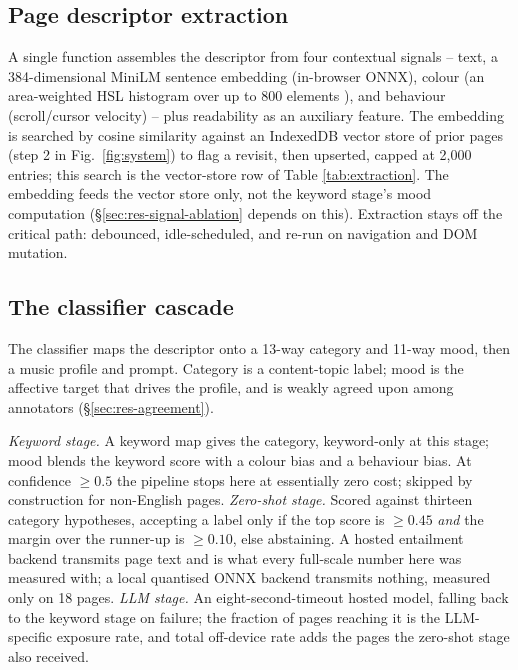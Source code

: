 \documentclass[conference]{IEEEtran}
\begin{document}
\subsection{Page descriptor extraction}

A single function assembles the descriptor from four contextual signals
-- text, a 384-dimensional MiniLM sentence embedding (in-browser ONNX),
colour (an area-weighted HSL histogram over up to 800 elements
\cite{dominantcolour}), and behaviour (scroll/cursor velocity) -- plus
readability \cite{flesch} as an auxiliary feature. The embedding is
searched by cosine similarity against an IndexedDB vector store of prior
pages (step 2 in Fig.~\ref{fig:system}) to flag a revisit, then upserted,
capped at 2,000 entries; this search is the vector-store row of Table
\ref{tab:extraction}. The embedding feeds the vector store only, not the
keyword stage's mood computation (\S\ref{sec:res-signal-ablation}
depends on this). Extraction stays off
the critical path: debounced, idle-scheduled, and re-run on navigation
and DOM mutation.

\subsection{The classifier cascade}

The classifier maps the descriptor onto a 13-way category and 11-way
mood, then a music profile and prompt. Category is a content-topic
label; mood is the affective target that drives the profile, and is
weakly agreed upon among annotators (\S\ref{sec:res-agreement}).

\emph{Keyword stage.} A keyword map gives the category, keyword-only
at this stage; mood blends the keyword score with a colour bias and a
behaviour bias. At confidence $\geq 0.5$ the pipeline stops here at
essentially zero cost; skipped by construction for non-English pages.
\emph{Zero-shot stage.} Scored against thirteen category
hypotheses, accepting a label only if the top score is $\geq 0.45$
\emph{and} the margin over the runner-up is $\geq 0.10$, else abstaining.
A hosted entailment backend transmits page text and is what every
full-scale number here was measured with; a local quantised ONNX backend
transmits nothing, measured only on 18 pages. \emph{LLM stage.} An eight-second-timeout hosted model, falling back to the keyword stage on
failure; the fraction of pages reaching it is the LLM-specific exposure
rate, and total off-device rate adds the pages the zero-shot stage also
received.
\end{document}

